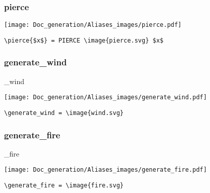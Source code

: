 \documentclass{article}
\begin{document}
\subsubsection{pierce}
\begin{minipage}{0.45\linewidth}
\raggedright
\begin{spverbatim}
\end{spverbatim}
\end{minipage}
\begin{minipage}{0.45\linewidth}
\raggedleft
\texttt{[image: Doc\_generation/Aliases\_images/pierce.pdf]}
\end{minipage}
\begin{center}
\begin{BVerbatim}
\pierce{$x$} = PIERCE \image{pierce.svg} $x$
\end{BVerbatim}
\end{center}

\subsubsection{generate\_wind}
\begin{minipage}{0.45\linewidth}
\raggedright
\begin{spverbatim}
\generate_wind 
\end{spverbatim}
\end{minipage}
\begin{minipage}{0.45\linewidth}
\raggedleft
\texttt{[image: Doc\_generation/Aliases\_images/generate\_wind.pdf]}
\end{minipage}
\begin{center}
\begin{BVerbatim}
\generate_wind = \image{wind.svg}
\end{BVerbatim}
\end{center}

\subsubsection{generate\_fire}
\begin{minipage}{0.45\linewidth}
\raggedright
\begin{spverbatim}
\generate_fire 
\end{spverbatim}
\end{minipage}
\begin{minipage}{0.45\linewidth}
\raggedleft
\texttt{[image: Doc\_generation/Aliases\_images/generate\_fire.pdf]}
\end{minipage}
\begin{center}
\begin{BVerbatim}
\generate_fire = \image{fire.svg}
\end{BVerbatim}
\end{center}
\end{document}
